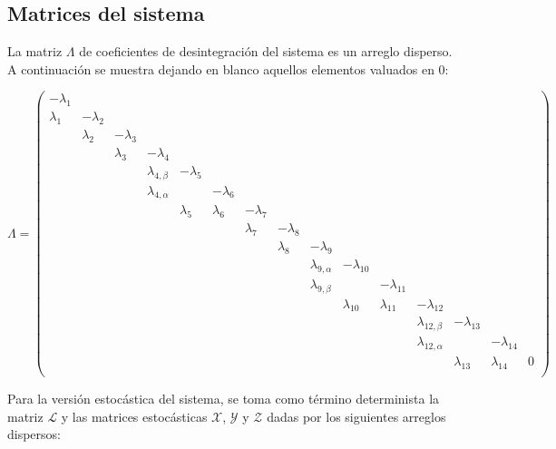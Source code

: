 \subsection{Matrices del sistema}
La matriz $\Lambda$ de coeficientes de desintegración del sistema es un arreglo disperso. A continuación se muestra dejando en blanco aquellos elementos valuados en 0:

\begin{equation}
	\Lambda=\left(\begin{smallmatrix}
		-\lambda_1& & & & & & & & & & & & & & \\
		 \lambda_1&-\lambda_2& & & & & & & & & & & & & \\
		 & \lambda_2&-\lambda_3& & & & & & & & & & & & \\
		 & & \lambda_3&-\lambda_4& & & & & & & & & & & \\
		 & & &\lambda_{4,\beta}&-\lambda_5& & & & & & & & & & \\
		 & & &\lambda_{4, \alpha}& &-\lambda_6& & & & & & & & & \\
		 & & & & \lambda_5& \lambda_6&-\lambda_7& & & & & & & & \\
		 & & & & & & \lambda_7&-\lambda_8& & & & & & & \\
		 & & & & & & & \lambda_8&-\lambda_9& & & & & & \\
		 & & & & & & & &\lambda_{9,\alpha}&-\lambda_{10}& & & & & \\
		 & & & & & & & &\lambda_{9, \beta}& &-\lambda_{11}& & & & \\
		 & & & & & & & & & \lambda_{10}&\lambda_{11}&-\lambda_{12}& & & \\
		 & & & & & & & & & & &\lambda_{12, \beta}&-\lambda_{13}& & \\
		 & & & & & & & & & & &\lambda_{12, \alpha}& &-\lambda_{14}& \\ 
		 & & & & & & & & & & & &\lambda_{13}&\lambda_{14}& 0\\
	\end{smallmatrix}\right)
\end{equation}\label{matriz_determinista}

Para la versión estocástica del sistema, se toma como término determinista la matriz $\mathcal{L}$ y las matrices estocásticas $\mathcal{X}$, $\mathcal{Y}$ y $\mathcal{Z}$ dadas por los siguientes arreglos dispersos:

